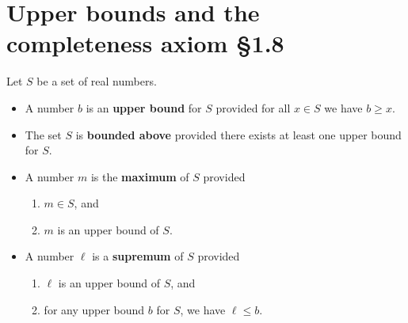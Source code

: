 \documentclass[12pt]{amsart}
\begin{document}
	
	\thispagestyle{empty}
	
	\section*{Upper bounds and the completeness axiom \S1.8}
	
	

\begin{framed}
Let $S$ be a set of real numbers. 
\begin{itemize}
\item A number $b$ is an \textbf{upper bound} for $S$ provided for all $x\in S$ we have $b\geq x$. 
\item The set $S$ is \textbf{bounded above} provided there exists at least one upper bound for $S$.
\item A number $m$ is the \textbf{maximum} of $S$ provided
\begin{enumerate}
\item $m\in S$, and
\item $m$ is an upper bound of $S$.
\end{enumerate}
\item A number $\ell$ is a \textbf{supremum} of $S$ provided
\begin{enumerate}
\item $\ell$ is an upper bound of $S$, and
\item for any upper bound $b$ for $S$, we have $\ell \leq b$.
\end{enumerate}
\end{itemize}
\end{framed}

\
\end{document}
